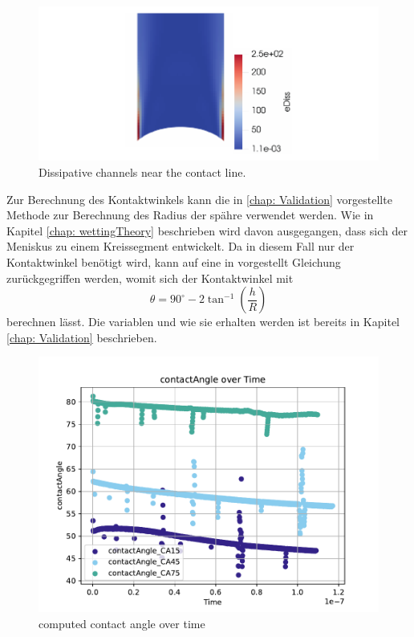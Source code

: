 \begin{figure}[h]
    \centering
    \includegraphics[width=.95\textwidth]{Pictures/eDiss_Wedge.pdf}
    \caption{Dissipative channels near the contact line.}
    \label{fig: eDiss_wedge}
\end{figure}

Zur Berechnung des Kontaktwinkels kann die in \ref*{chap: Validation} vorgestellte Methode zur Berechnung des Radius der spähre verwendet werden. Wie in Kapitel \ref*{chap: wettingTheory} beschrieben wird davon ausgegangen, dass sich der Meniskus zu einem Kreissegment entwickelt. Da in diesem Fall nur der Kontaktwinkel benötigt wird, kann auf eine in \cite{buttPhysicsChemistryInterfaces} vorgestellt Gleichung zurückgegriffen werden, womit sich der Kontaktwinkel mit 
\begin{equation}
    \theta = 90^{\circ}- 2\tan^{-1}\left(\frac{h}{R}\right) 
\end{equation}
berechnen lässt. Die variablen und wie sie erhalten werden ist bereits in Kapitel \ref*{chap: Validation} beschrieben. 
\begin{figure}[h]
    \centering
    \includegraphics[width=.95\textwidth]{Pictures/contactAngle_overTime.pdf}
    \caption{computed contact angle over time }
    \label{fig: eDiss_wedge}
\end{figure}




